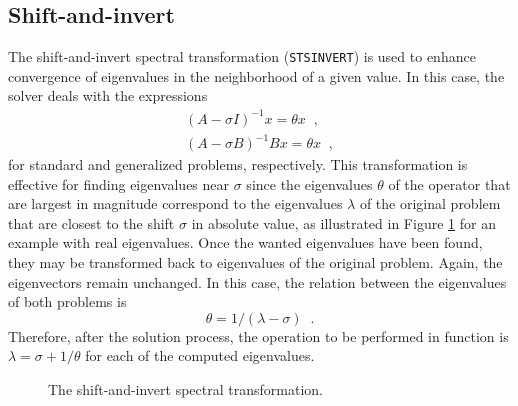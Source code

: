 \subsection{Shift-and-invert}

	The shift-and-invert spectral transformation (\texttt{STSINVERT}) is used to enhance convergence of eigenvalues in the neighborhood of a given value. In this case, the solver deals with the expressions 
\begin{eqnarray}
(A-\sigma I)^{-1}x=\theta x\;\;,\\
(A-\sigma B)^{-1}B x=\theta x\;\;,
\end{eqnarray}
for standard and generalized problems, respectively. 
This transformation is effective for finding eigenvalues near $\sigma$ since the eigenvalues $\theta$ of the operator that are largest in magnitude correspond to the eigenvalues $\lambda$ of the original problem that are closest to the shift $\sigma$ in absolute value, as illustrated in Figure \ref{fig:sinvert} for an example with real eigenvalues. Once the wanted eigenvalues have been found, they may be transformed back to eigenvalues of the original problem. Again, the eigenvectors remain unchanged.
In this case, the relation between the eigenvalues of both problems is
\begin{equation}\theta=1/(\lambda-\sigma)\;\;.\end{equation}
Therefore, after the solution process, the operation to be performed in function  is $\lambda=\sigma+1/\theta$ for each of the computed eigenvalues.

  \begin{figure}
    \centering
    \caption{\label{fig:sinvert}The shift-and-invert spectral transformation.}
  \end{figure}

